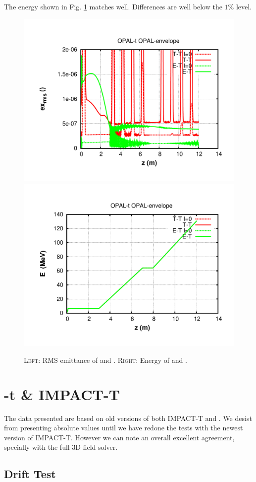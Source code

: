 \documentclass{psi-note}    %
\begin{document}
The energy shown in Fig. \ref{fig:tt_et_energy} matches well. Differences are
well below the $1\%$ level.
\begin{figure}[htbp]
\begin{center}
\includegraphics[width=.4\linewidth]{figures/et-tt-exrms}
\includegraphics[width=.4\linewidth]{figures/et-tt-energy}
\caption{\textsc{Left}: RMS emittance of \opalt and \opale. \textsc{Right}: Energy of \opalt and \opale.}
\label{fig:tt_et_energy}
\end{center}
\end{figure}
\clearpage
\section{\opal-t \& IMPACT-T} \label{sec:OPALImpactt}

The data presented are based on old versions of both IMPACT-T and \opal. We
desist from presenting absolute values until we have redone the tests with
the newest version of IMPACT-T. However we can note an overall excellent
agreement, specially with the full 3D field solver. 

\subsection{Drift Test} \label{sec:Drift}
\end{document}
